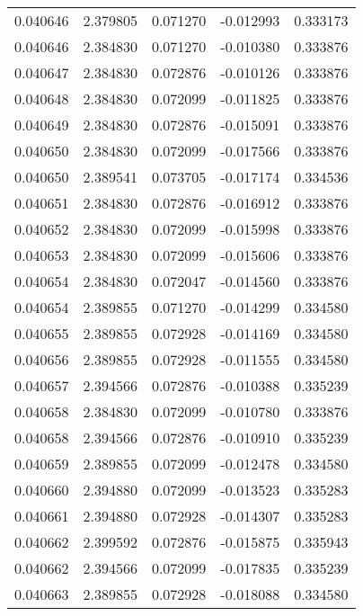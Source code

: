 \begin{tabular}{lrrrr}
0.040646    &  2.379805 &  0.071270 & -0.012993 &             0.333173 \\
0.040646    &  2.384830 &  0.071270 & -0.010380 &             0.333876 \\
0.040647    &  2.384830 &  0.072876 & -0.010126 &             0.333876 \\
0.040648    &  2.384830 &  0.072099 & -0.011825 &             0.333876 \\
0.040649    &  2.384830 &  0.072876 & -0.015091 &             0.333876 \\
0.040650    &  2.384830 &  0.072099 & -0.017566 &             0.333876 \\
0.040650    &  2.389541 &  0.073705 & -0.017174 &             0.334536 \\
0.040651    &  2.384830 &  0.072876 & -0.016912 &             0.333876 \\
0.040652    &  2.384830 &  0.072099 & -0.015998 &             0.333876 \\
0.040653    &  2.384830 &  0.072099 & -0.015606 &             0.333876 \\
0.040654    &  2.384830 &  0.072047 & -0.014560 &             0.333876 \\
0.040654    &  2.389855 &  0.071270 & -0.014299 &             0.334580 \\
0.040655    &  2.389855 &  0.072928 & -0.014169 &             0.334580 \\
0.040656    &  2.389855 &  0.072928 & -0.011555 &             0.334580 \\
0.040657    &  2.394566 &  0.072876 & -0.010388 &             0.335239 \\
0.040658    &  2.384830 &  0.072099 & -0.010780 &             0.333876 \\
0.040658    &  2.394566 &  0.072876 & -0.010910 &             0.335239 \\
0.040659    &  2.389855 &  0.072099 & -0.012478 &             0.334580 \\
0.040660    &  2.394880 &  0.072099 & -0.013523 &             0.335283 \\
0.040661    &  2.394880 &  0.072928 & -0.014307 &             0.335283 \\
0.040662    &  2.399592 &  0.072876 & -0.015875 &             0.335943 \\
0.040662    &  2.394566 &  0.072099 & -0.017835 &             0.335239 \\
0.040663    &  2.389855 &  0.072928 & -0.018088 &             0.334580 \\

\end{tabular}
